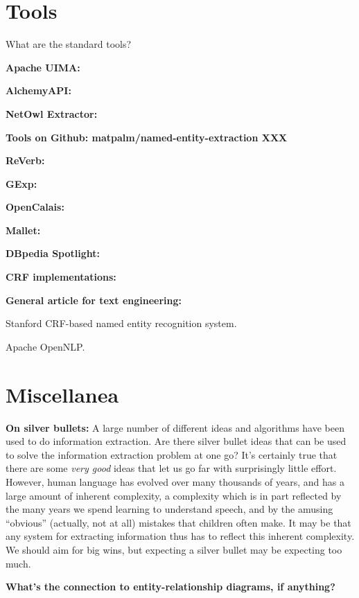 \section{Tools}

What are the standard tools?

\textbf{Apache UIMA:}

\textbf{AlchemyAPI:}

\textbf{NetOwl Extractor:}

\textbf{Tools on Github: matpalm/named-entity-extraction XXX}

\textbf{ReVerb:}

\textbf{GExp:}

\textbf{OpenCalais:}

\textbf{Mallet:}

\textbf{DBpedia Spotlight:}

\textbf{CRF implementations:}

\textbf{General article for text engineering:}

Stanford CRF-based named entity recognition system.

Apache OpenNLP.

\section{Miscellanea}

\textbf{On silver bullets:} A large number of different ideas and
algorithms have been used to do information extraction.  Are there
silver bullet ideas that can be used to solve the information
extraction problem at one go?  It's certainly true that there are some
\emph{very good} ideas that let us go far with surprisingly little
effort.  However, human language has evolved over many thousands of
years, and has a large amount of inherent complexity, a complexity
which is in part reflected by the many years we spend learning to
understand speech, and by the amusing ``obvious'' (actually, not at
all) mistakes that children often make.  It may be that any system for
extracting information thus has to reflect this inherent complexity.
We should aim for big wins, but expecting a silver bullet may be
expecting too much.

\textbf{What's the connection to entity-relationship diagrams, if
  anything?}

